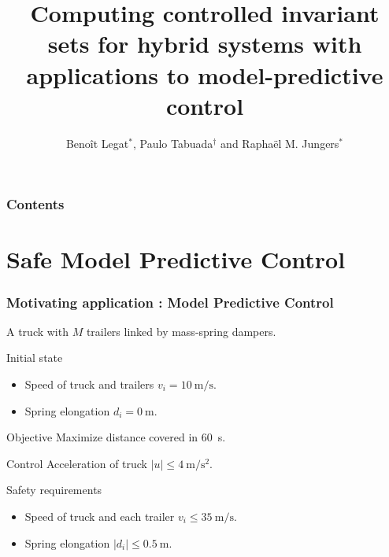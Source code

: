 \documentclass{beamer}
\title{Computing controlled invariant sets for hybrid systems with applications to model-predictive control}
\date{}
\author{Beno\^it Legat${}^*$, Paulo Tabuada${}^\dagger$ and Rapha\"el M. Jungers${}^*$}
\institute{${}^*$ UCLouvain, ${}^\dagger$ UCLA}
\begin{document}
\maketitle

\begin{frame}
  \frametitle{Contents}
  \tableofcontents
\end{frame}

\section{Safe Model Predictive Control}

\begin{frame}
  \frametitle{Motivating application : Model Predictive Control}
  A truck with $M$ trailers linked by mass-spring dampers.

  \begin{block}{Initial state}
    \vspace{-1em}
    \begin{itemize}
      \item Speed of truck and trailers $v_i = \SI{10}{\meter\per\second}$.
      \item Spring elongation $d_i = \SI{0}{\meter}$.
    \end{itemize}
  \end{block}
  \vspace{-1em}
  \begin{block}{Objective}
    Maximize distance covered in \SI{60}{\second}.
  \end{block}
  \vspace{-.5em}
  \begin{block}{Control}
    Acceleration of truck $|u| \leq \SI{4}{\meter\per\second\squared}$.
  \end{block}
  \vspace{-.5em}
  \begin{block}{\alert{Safety} requirements}
    \vspace{-1em}
    \begin{itemize}
      \item Speed of truck and each trailer $v_i \leq \SI{35}{\meter\per\second}$.
      \item Spring elongation $|d_i| \leq \SI{0.5}{\meter}$.
    \end{itemize}
  \end{block}
  \vspace{-1em}
  \begin{center}
    \begin{tikzpicture}
      
    \end{tikzpicture}
  \end{center}
\end{frame}
\end{document}
